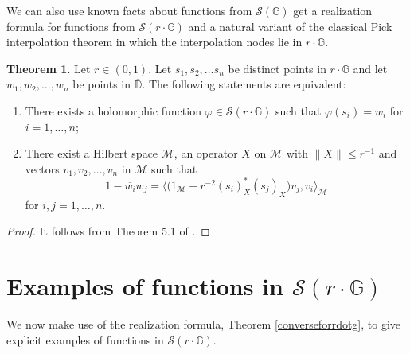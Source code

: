 \documentclass[12pt,reqno]{amsart}
\numberwithin{equation}{section}
\theoremstyle{definition}
\newtheorem{thm}[equation]{Theorem}
\begin{document}
We can also use known facts about functions from $\mathcal{S}(\mathbb{G})$ get a realization formula for functions from 
$\mathcal{S}(r \cdot \mathbb{G})$ and a natural variant of the classical Pick interpolation theorem in which the interpolation nodes lie in $r \cdot \mathbb{G}$.
\begin{thm}\label{interpolationGr} Let  $r\in(0,1)$.
    Let $s_{1},s_{2},\hdots s_{n}$ be distinct points in $r\cdot\mathbb{G}$ and let $w_{1},w_{2},\hdots,w_{n}$ be points in $\overline{\mathbb{D}}$. The following statements are equivalent:  
\begin{enumerate}
    \item There exists a holomorphic function $\varphi\in\mathcal{S}(r\cdot\mathbb{G})$
  such that $\varphi(s_{i})=w_{i}$ for $i=1,\hdots,n$;
    \item There exist a Hilbert space $\mathcal{M}$, an operator $X$  on $\mathcal{M}$ with 
$\|X\| \leq r^{-1}$ and vectors $v_{1},v_{2},\hdots,v_{n}$ in $\mathcal{M}$ such that 
\begin{equation}\label{interpolationmodel}
1-\overline{w_{i}}w_{j}=\bigg\langle \Big(1_{\mathcal{M}}-r^{-2} (s_{i})^{*}_{X} (s_{j})_{X}\Big)v_{j},v_{i}\bigg\rangle_{\mathcal{M}}
\end{equation}
for $i,j=1,\hdots,n$.
\end{enumerate} 
\end{thm}
\begin{proof}
It follows from Theorem 5.1 of \cite{AY17}. \end{proof}







\section{Examples of functions in $\mathcal{S}(r\cdot \mathbb{G})$}

We now make use of the realization formula, Theorem \ref{converseforrdotg}, to give explicit examples of functions in $\mathcal{S}(r\cdot \mathbb{G})$.
\end{document}
